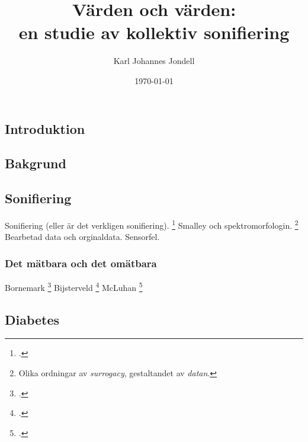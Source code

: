 \documentclass[11pt, twoside, a4paper]{article}
\title{Värden och värden:\\
	\large en studie av kollektiv sonifiering
}
\author{Karl Johannes Jondell}
\date{\today}
\begin{document}



\tableofcontents
\clearpage

\newpage
\begin{multicols}{2}

\section*{Introduktion}
\kant[1]

\subsection*{Bakgrund}
\kant[2-2]


\subsection*{Sonifiering}
\kant[3-3]
Sonifiering (eller är det verkligen sonifiering). \footcite[2]{bijsterveld_sonic_2019}
Smalley och spektromorfologin. \footnote{Olika ordningar av \emph{surrogacy},  gestaltandet av \emph{datan}.} Bearbetad data och orginaldata. Sensorfel.

\subsubsection*{Det mätbara och det omätbara}
Bornemark \footcite{bornemark_det_2018}
Bijsterveld \footcite[100-102]{bijsterveld_sonic_2019}
McLuhan \footcite[2]{mcluhan_understanding_2015}
\subsection*{Diabetes}
\kant[4-4]


\end{multicols}
\end{document}
